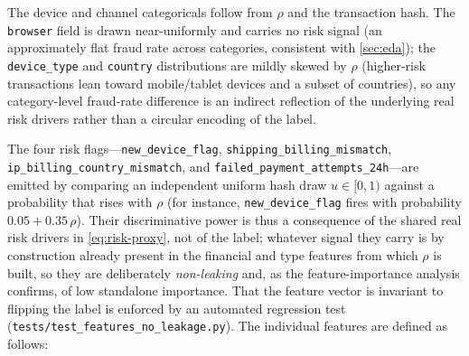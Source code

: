 The device and channel categoricals follow from $\rho$ and the transaction hash. The \texttt{browser} field is drawn near-uniformly and carries no risk signal (an approximately flat fraud rate across categories, consistent with \cref{sec:eda}); the \texttt{device\_type} and \texttt{country} distributions are mildly skewed by $\rho$ (higher-risk transactions lean toward mobile/tablet devices and a subset of countries), so any category-level fraud-rate difference is an indirect reflection of the underlying real risk drivers rather than a circular encoding of the label.

The four risk flags---\texttt{new\_device\_flag}, \texttt{shipping\_billing\_mismatch}, \texttt{ip\_billing\_country\_mismatch}, and \texttt{failed\_payment\_attempts\_24h}---are emitted by comparing an independent uniform hash draw $u \in [0,1)$ against a probability that rises with $\rho$ (for instance, \texttt{new\_device\_flag} fires with probability $0.05 + 0.35\,\rho$). Their discriminative power is thus a consequence of the shared real risk drivers in \cref{eq:risk-proxy}, not of the label; whatever signal they carry is by construction already present in the financial and type features from which $\rho$ is built, so they are deliberately \emph{non-leaking} and, as the feature-importance analysis confirms, of low standalone importance. That the feature vector is invariant to flipping the label is enforced by an automated regression test (\texttt{tests/test\_features\_no\_leakage.py}). The individual features are defined as follows:
